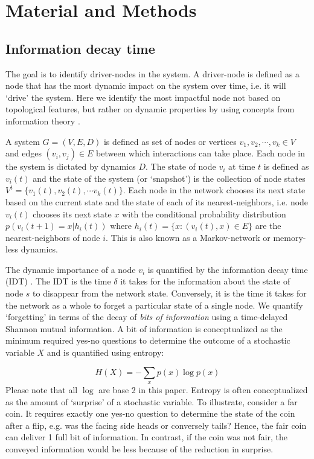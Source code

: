 \documentclass[twoside, twocolumn]{article}
\begin{document}
	
	
		
	
	\section{Material and Methods} \label{sec:methods}
	\subsection{Information decay time}
	
	The goal is to identify driver-nodes in the system. A driver-node is defined as a node that has the most dynamic impact on the system over time, i.e. it will `drive' the system. Here we identify the most impactful node  not based on topological features, but rather on dynamic properties by using concepts from information theory \cite{Quax2013}.
	
	
	A system $G = (V, E, D)$ is defined as set of nodes or vertices $v_1, v_2, \cdots, v_k \in V$ and edges $(v_i, v_j)\in E$ between which interactions can take place. Each node in the system is dictated by dynamics $D$. The state of node $v_i$ at time $t$ is defined as $v_i(t)$ and the state of the system (or `snapshot') is the collection of node states $V^t = \{v_1(t), v_2(t), \cdots v_k(t)\}$. Each node in the network chooses its next state based on the current state and the state of each of its nearest-neighbors, i.e. node $v_i(t)$ chooses its next state $x$ with the conditional probability distribution $p(v_i(t+1) = x \vert h_i(t))$ where $h_i(t) = \{x: (v_i(t), x) \in E\}$ are the nearest-neighbors of node $i$. This is also known as a Markov-network or memory-less dynamics. 
	
	
	The dynamic importance of a node $v_i$ is quantified by the information decay time (IDT) \cite{Quax2013}. The IDT is the time $\delta$ it takes for the information about the state of node $s$ to disappear from the network state. Conversely, it is the time it takes for the network as a whole to forget a particular state of a single node. We quantify `forgetting' in terms of the decay of \textit{ bits of information} using a time-delayed Shannon mutual information. A bit of information is conceptualized as the minimum required yes-no questions to determine the outcome of a stochastic variable $X$ and is quantified using entropy\cite{Shannon1948}:
	
	\begin{equation}\label{entropy}
	H(X) = - \sum_x p(x) \log p(x)
	\end{equation}
	Please note that all $\log$ are base 2 in this paper. 
	Entropy is often conceptualized as the amount of `surprise' of a stochastic variable. To illustrate, consider a far coin. It requires exactly one yes-no question to determine the state of the coin after a flip, e.g. was the facing side heads or conversely tails? Hence, the fair coin can deliver 1 full bit of information. In contrast, if the coin was not fair, the conveyed information would be less because of the reduction in surprise\cite{Cover2005}. 
	
\end{document}
